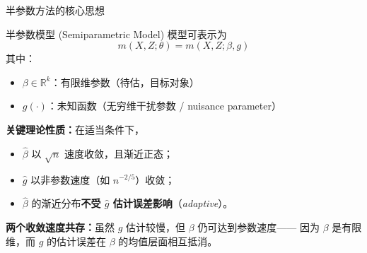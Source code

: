 \documentclass[aspectratio=169, 10pt]{beamer}
\begin{document}
\begin{frame}{半参数方法的核心思想}

  \begin{definitionbox}{{半参数模型 (Semiparametric Model)}}
    模型可表示为
    $$m(X, Z; \theta) = m(X, Z; \beta, g)$$
    其中：
    \begin{itemize}\setlength{\itemsep}{1pt}
      \item \textbf{$\beta \in \mathbb{R}^k$}：有限维参数（待估，目标对象）
      \item \textbf{$g(\cdot)$}：未知函数（无穷维干扰参数 / nuisance parameter）
    \end{itemize}
  \end{definitionbox}

  \vspace{-0.3em}
  \begin{highlightbox}
    \textbf{关键理论性质：}在适当条件下，
    \begin{itemize}\setlength{\itemsep}{1pt}
      \item $\hat\beta$ 以 $\sqrt{n}$ 速度收敛，且渐近正态；
      \item $\hat g$ 以非参数速度（如 $n^{-2/5}$）收敛；
      \item $\hat\beta$ 的渐近分布\textbf{不受 $\hat g$ 估计误差影响}（\emph{adaptive}）。
    \end{itemize}
  \end{highlightbox}

  \begin{keybox}
    \textbf{两个收敛速度共存：}虽然 $g$ 估计较慢，但 $\beta$ 仍可达到参数速度——
    因为 $\beta$ 是有限维，而 $g$ 的估计误差在 $\beta$ 的均值层面相互抵消。
  \end{keybox}

\end{frame}
\end{document}
